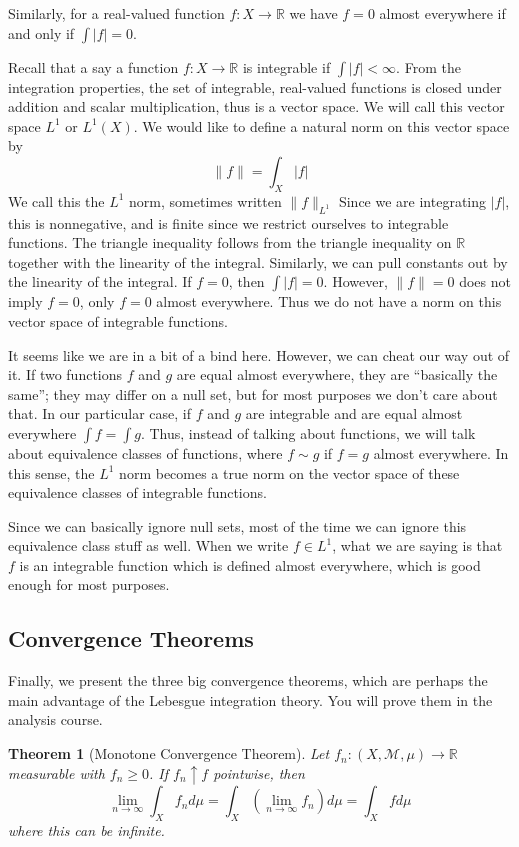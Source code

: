 \documentclass[10pt]{article}         %
\newtheorem{theorem}{Theorem}[section]
\theoremstyle{remark}
\newcommand{\R}{\mathbb{R}}
\begin{document}
Similarly, for a real-valued function $f:X \rightarrow \R$ we have $f = 0$ almost everywhere if and only if $\int |f| = 0$.

Recall that a say a function $f:X \rightarrow \R$ is integrable if $\int |f| < \infty$. From the integration properties, the set of integrable, real-valued functions is closed under addition and scalar multiplication, thus is a vector space. We will call this vector space $L^1$ or $L^1(X)$. We would like to define a natural norm on this vector space by
\[
\|f\| = \int_X |f|
\]
We call this the $L^1$ norm, sometimes written $\|f\|_{L^1}$
Since we are integrating $|f|$, this is nonnegative, and is finite since we restrict ourselves to integrable functions. The triangle inequality follows from the triangle inequality on $\R$ together with the linearity of the integral. Similarly, we can pull constants out by the linearity of the integral. If $f = 0$, then $\int |f| = 0$. However, $\|f\| = 0$ does not imply $f = 0$, only $f = 0$ almost everywhere. Thus we do not have a norm on this vector space of integrable functions.

It seems like we are in a bit of a bind here. However, we can cheat our way out of it. If two functions $f$ and $g$ are equal almost everywhere, they are ``basically the same''; they may differ on a null set, but for most purposes we don't care about that. In our particular case, if $f$ and $g$ are integrable and are equal almost everywhere $\int f = \int g$. Thus, instead of talking about functions, we will talk about equivalence classes of functions, where $f \sim g$ if $f = g$ almost everywhere. In this sense, the $L^1$ norm becomes a true norm on the vector space of these equivalence classes of integrable functions. 

Since we can basically ignore null sets, most of the time we can ignore this equivalence class stuff as well. When we write $f \in L^1$, what we are saying is that $f$ is an integrable function which is defined almost everywhere, which is good enough for most purposes.

\subsection{Convergence Theorems}

Finally, we present the three big convergence theorems, which are perhaps the main advantage of the Lebesgue integration theory. You will prove them in the analysis course.

\begin{theorem}[Monotone Convergence Theorem]
Let $f_n: (X,\mathcal{M},\mu) \rightarrow \R$ measurable with $f_n \geq 0$. If $f_n \uparrow f$ pointwise, then
\[
\lim_{n\rightarrow \infty} \int_X f_n d\mu = \int_X \left(\lim_{n\rightarrow \infty} f_n\right) d\mu= 
\int_X f d\mu 
\]
where this can be infinite.
\end{theorem}
\end{document}
